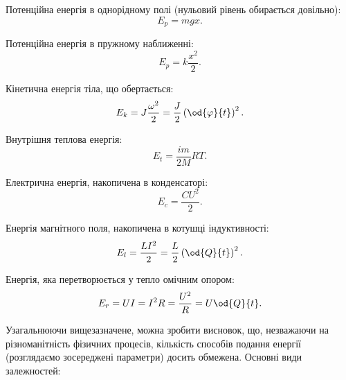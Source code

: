Потенційна енергія в однорідному полі (нульовий рівень обирається довільно):
%
\begin{equation}
  E_p = m g x .
  \label{atu:eq:Ep_g}
\end{equation}

Потенційна енергія в пружному наближенні:
%
\begin{equation}
  E_p = k \frac{x^2}{2} .
  \label{atu:eq:Ep_spring}
\end{equation}

Кінетична енергія тіла, що обертається:
%
\begin{equation}
  E_k = J \frac{\omega^2}{2} = \frac{J}{2} \left( \od{\varphi}{t} \right)^2 .
  \label{atu:eq:Ek_spin}
\end{equation}

Внутрішня теплова енергія:
%
\begin{equation}
  E_t = \frac{im}{2M} RT.
  \label{atu:eq:Et}
\end{equation}

Електрична енергія, накопичена в конденсаторі:
%
\begin{equation}
  E_c = \frac{C U^2}{2}.
  \label{atu:eq:Ec}
\end{equation}

Енергія магнітного поля, накопичена в котушці індуктивності:
%
\begin{equation}
  E_l = \frac{L I^2}{2} = \frac{L}{2} \left( \od{Q}{t}\right)^2 .
  \label{atu:eq:El}
\end{equation}

Енергія, яка перетворюється у тепло омічним опором:
%
\begin{equation}
  E_r = U I = I^2 R = \frac{U^2}{R} = U \od{Q}{t} .
  \label{atu:eq:Er}
\end{equation}


%


Узагальнюючи вищезазначене, можна зробити висновок, що, незважаючи на
різноманітність фізичних процесів, кількість способів подання енергії
(розглядаємо зосереджені параметри) досить обмежена. Основні види залежностей:

